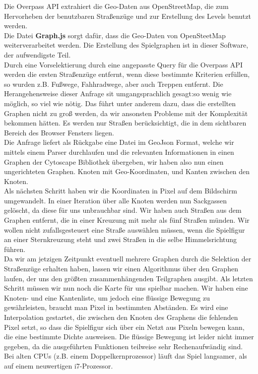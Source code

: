 \documentclass[11pt,a4paper]{article}
\begin{document}
Die Overpass API extrahiert die Geo-Daten aus OpenStreetMap, die zum Hervorheben der benutzbaren Straßenzüge und zur Erstellung des Levels benutzt werden.\\
Die Datei \textbf{Graph.js} sorgt dafür, dass die Geo-Daten von OpenSteetMap weiterverarbeitet werden.
Die Erstellung des Spielgraphen ist in dieser Software, der aufwendigste Teil. \\
Durch eine Vorselektierung durch eine angepasste Query für die Overpass API werden die ersten Straßenzüge entfernt, wenn diese bestimmte Kriterien erfüllen, so wurden z.B. Fußwege, Fahhradwege, aber auch Treppen entfernt. Die Herangehensweise dieser Anfrage sit umgangsprachlich gesagt:\glqq so wenig wie möglich, so viel wie nötig\grqq. Das führt unter anderem dazu, dass die erstellten Graphen nicht zu groß werden, da wir ansonsten Probleme mit der Komplexität bekommen hätten. Es werden nur Straßen berücksichtigt, die in dem sichtbaren Bereich des Browser Fensters liegen.\\
Die Anfrage liefert als Rückgabe eine Datei im GeoJson Format, welche wir mittels einem Parser durchlaufen und die relevanten Informationen in einen Graphen der Cytoscape Bibliothek übergeben, wir haben also nun einen ungerichteten Graphen. Knoten mit Geo-Koordinaten, und Kanten zwischen den Knoten. \\
Als nächsten Schritt haben wir die Koordinaten in Pixel auf dem Bildschirm umgewandelt.
In einer Iteration über alle Knoten werden nun Sackgassen gelöscht, da diese für uns unbrauchbar sind.
Wir haben auch Straßen aus dem Graphen entfernt, die in einer Kreuzung mit mehr als fünf Straßen münden. Wir wollen nicht zufallsgesteuert eine Straße auswählen müssen, wenn die Spielfigur an einer Sternkreuzung steht und zwei Straßen in die selbe Himmelsrichtung führen. \\
Da wir am jetzigen Zeitpunkt eventuell mehrere Graphen durch die Selektion der Straßenzüge erhalten haben, lassen wir einen Algorithmus über den Graphen laufen, der uns den größten zusammenhängenden Teilgraphen ausgibt. 
Als letzten Schritt müssen wir nun noch die Karte für uns spielbar machen. Wir haben eine Knoten- und eine Kantenliste, um jedoch eine flüssige Bewegung zu gewährleisten, braucht man Pixel in bestimmten Abständen.
Es wird eine Interpolation gestartet, die zwischen den Knoten des Graphens die fehlenden Pixel setzt, so dass die Spielfigur sich über ein Netzt aus Pixeln bewegen kann, die eine bestimmte Dichte ausweisen. 
Die flüssige Bewegung ist leider nicht immer gegeben, da die ausgeführten Funktionen teilweise sehr Rechenaufwändig sind.
Bei alten CPUs (z.B. einem Doppelkernprozessor) läuft das Spiel langsamer, als auf einem neuwertigen i7-Prozessor.
\end{document}
